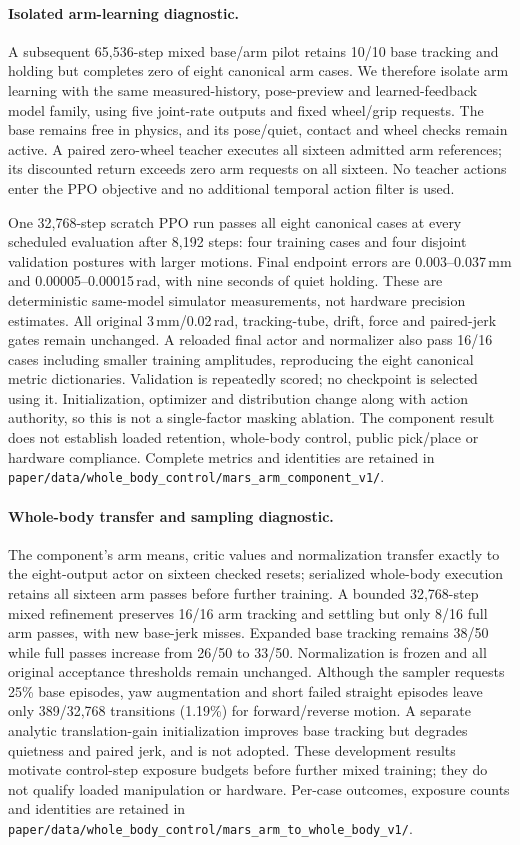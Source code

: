 \paragraph{Isolated arm-learning diagnostic.}
A subsequent 65,536-step mixed base/arm pilot retains 10/10 base tracking and
holding but completes zero of eight canonical arm cases. We therefore isolate
arm learning with the same measured-history, pose-preview and learned-feedback
model family, using five joint-rate outputs and fixed wheel/grip requests. The
base remains free in physics, and its pose/quiet, contact and wheel checks remain
active. A paired zero-wheel teacher executes all sixteen admitted arm references;
its discounted return exceeds zero arm requests on all sixteen. No teacher
actions enter the PPO objective and no additional temporal action filter is used.

One 32,768-step scratch PPO run passes all eight canonical cases at every
scheduled evaluation after 8,192 steps: four training cases and four disjoint
validation postures with larger motions. Final endpoint errors are
0.003--0.037\,mm and 0.00005--0.00015\,rad, with nine seconds of quiet holding.
These are deterministic same-model simulator measurements, not hardware
precision estimates. All original 3\,mm/0.02\,rad, tracking-tube, drift, force and
paired-jerk gates remain unchanged. A reloaded final actor and normalizer also
pass 16/16 cases including smaller training amplitudes, reproducing the eight
canonical metric dictionaries. Validation is repeatedly scored; no checkpoint
is selected using it. Initialization, optimizer and distribution change along
with action authority, so this is not a single-factor masking ablation.
The component result does not establish loaded retention, whole-body control,
public pick/place or hardware compliance. Complete metrics and identities are
retained in \texttt{paper/data/whole\_body\_control/mars\_arm\_component\_v1/}.

\paragraph{Whole-body transfer and sampling diagnostic.}
The component's arm means, critic values and normalization transfer exactly to
the eight-output actor on sixteen checked resets; serialized whole-body
execution retains all sixteen arm passes before further training. A bounded
32,768-step mixed refinement preserves 16/16 arm tracking and settling but
only 8/16 full arm passes, with new base-jerk misses. Expanded base tracking
remains 38/50 while full passes increase from 26/50 to 33/50. Normalization is
frozen and all original acceptance thresholds remain unchanged. Although the
sampler requests 25\% base episodes, yaw augmentation and short failed straight
episodes leave only 389/32,768 transitions (1.19\%) for forward/reverse motion.
A separate analytic translation-gain initialization improves base tracking but
degrades quietness and paired jerk, and is not adopted. These development
results motivate control-step exposure budgets before further mixed training;
they do not qualify loaded manipulation or hardware. Per-case outcomes,
exposure counts and identities are retained in
\texttt{paper/data/whole\_body\_control/mars\_arm\_to\_whole\_body\_v1/}.

